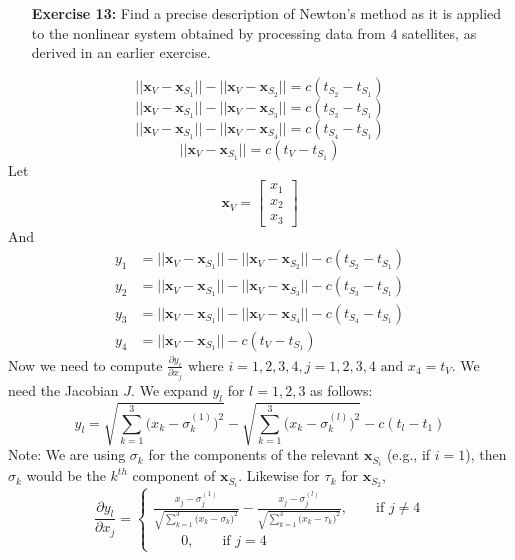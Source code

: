 \documentclass[11pt]{article}
\theoremstyle{definition}
\newcommand{\1}[1]{\mathbf{1} \left \{ #1 \right \}}
\begin{document}
\begin{itemize}
\item[{\textbf{Exercise 13:}}] Find a precise description of Newton's method as it is applied to the nonlinear system obtained by processing data from $4$ satellites, as derived in an earlier exercise.
\end{itemize}
\[||\textbf{x}_V - \textbf{x}_{S_1}|| - ||\textbf{x}_V - \textbf{x}_{S_2}|| = c(t_{S_2} - t_{S_1})\]
\[||\textbf{x}_V - \textbf{x}_{S_1}|| - ||\textbf{x}_V - \textbf{x}_{S_3}|| = c(t_{S_3} - t_{S_1})\]
\[||\textbf{x}_V - \textbf{x}_{S_1}|| - ||\textbf{x}_V - \textbf{x}_{S_4}|| = c(t_{S_4} - t_{S_1})\]
\[||\textbf{x}_V - \textbf{x}_{S_1}|| = c(t_V - t_{S_1})\]
Let \[\textbf{x}_V = \begin{bmatrix}
x_1 \\ x_2 \\ x_3 \end{bmatrix}\]
And
\begin{align*}
    y_1 &= ||\textbf{x}_V - \textbf{x}_{S_1}|| - ||\textbf{x}_V - \textbf{x}_{S_2}|| - c(t_{S_2} - t_{S_1}) \\
    y_2 &= ||\textbf{x}_V - \textbf{x}_{S_1}|| - ||\textbf{x}_V - \textbf{x}_{S_3}|| - c(t_{S_3} - t_{S_1}) \\
    y_3 &= ||\textbf{x}_V - \textbf{x}_{S_1}|| - ||\textbf{x}_V - \textbf{x}_{S_4}|| - c(t_{S_4} - t_{S_1}) \\
    y_4 &= ||\textbf{x}_V - \textbf{x}_{S_1}|| - c(t_V - t_{S_1})
\end{align*}
Now we need to compute \(\frac{\partial y_i}{\partial x_j} \text{ where } i = 1, 2, 3, 4,  j = 1, 2, 3, 4 \text{ and } x_4 = t_V\).  We need the Jacobian $J$.  We expand $y_l$ for $l = 1, 2, 3$ as follows:
\begin{equation*}
    y_l = \sqrt{\sum_{k=1}^3 \big(x_k - \sigma_k^{(1)}\big)^2} - \sqrt{\sum_{k=1}^3 \big(x_k - \sigma_k^{(l)}\big)^2} - c(t_l - t_1)
\end{equation*}
Note: We are using $\sigma_k$ for the components of the relevant $\textbf{x}_{S_i}$ (e.g., if $i = 1$), then $\sigma_k$ would be the $k^{th}$ component of $\textbf{x}_{S_i}$.  Likewise for $\tau_k$ for $\textbf{x}_{S_2}$,
\begin{equation*}
    \frac{\partial y_l}{\partial x_j} = \begin{cases}
    \frac{x_j - \sigma_j^{(1)}}{\sqrt{\sum_{k=1}^3 \big(x_k - \sigma_k\big)^2}} - \frac{x_j - \sigma_j^{(l)}}{\sqrt{\sum_{k=1}^3 \big(x_k - \tau_k\big)^2}}, \qquad \text{if } j \neq 4 \\
    \qquad 0, \qquad \text{if } j = 4
    \end{cases}
\end{equation*}
\end{document}
